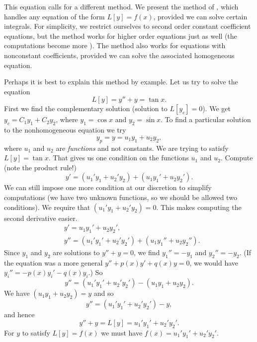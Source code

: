 This equation calls for a different method.  We present the method of
\emph{}, which handles any equation of
the form $L[y] = f(x)$,
provided we can solve certain integrals.  For simplicity, we restrict
ourselves to second order constant coefficient equations,
but the method works for higher
order equations just as well (the computations become more
). %
The method also works for equations with nonconstant coefficients,
provided we can solve the associated homogeneous equation.

Perhaps it is best to explain this method by example.
Let us try to solve the equation
\begin{equation*}
L[y] = y''+y = \tan x .
\end{equation*}
First we find the complementary solution (solution to $L[y_c] = 0$).  
We get $y_c = C_1 y_1 + C_2 y_2$, where $y_1 = \cos x$ and $y_2 = \sin x$.
To find a particular solution to the nonhomogeneous equation we try
\begin{equation*}
y_p = y = u_1 y_1 + u_2 y_2 ,
\end{equation*}
where $u_1$ and $u_2$ are \emph{functions} and not constants.
We are trying to satisfy $L[y] = \tan x$.  That gives us one condition on the
functions $u_1$ and $u_2$.
Compute (note the product rule!)
\begin{equation*}
y' = (u_1' y_1 + u_2' y_2) + (u_1 y_1' + u_2 y_2').
\end{equation*}
We can still
impose one more condition at our discretion to simplify computations (we have two unknown functions,
so we should be allowed two conditions).  We require that
$(u_1' y_1 + u_2' y_2) = 0$.  This makes computing the second derivative
easier.
\begin{align*}
& y' = u_1 y_1' + u_2 y_2' , \\
& y'' = (u_1' y_1' + u_2' y_2') + (u_1 y_1'' + u_2 y_2'') .
\end{align*}
Since $y_1$ and $y_2$ are solutions to $y''+y = 0$, we find
$y_1'' = - y_1$
and $y_2'' = - y_2$.
(If the equation was a more general $y''+p(x)y' +q(x)y = 0$, we would have
$y_i'' = -p(x)y_i' -q(x)y_i$.) So 
\begin{equation*}
y'' = (u_1' y_1' + u_2' y_2') - (u_1 y_1 + u_2 y_2) .
\end{equation*}
We have $(u_1 y_1 + u_2 y_2) = y$ and so
\begin{equation*}
y'' = (u_1' y_1' + u_2' y_2') - y ,
\end{equation*}
and hence
\begin{equation*}
y'' + y = L[y] = u_1' y_1' + u_2' y_2' .
\end{equation*}
For $y$ to satisfy $L[y] = f(x)$ we must have
$f(x) = u_1' y_1' + u_2' y_2'$.

